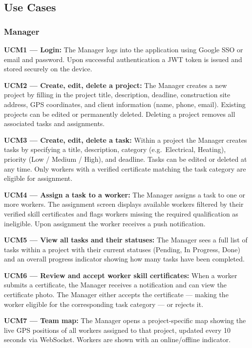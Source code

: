 \documentclass[12pt,a4paper]{article}
\begin{document}
\subsection{Use Cases}

\subsubsection{Manager}

\textbf{UCM1 --- Login:} The Manager logs into the application using Google SSO or email and password. Upon successful authentication a JWT token is issued and stored securely on the device.

\textbf{UCM2 --- Create, edit, delete a project:} The Manager creates a new project by filling in the project title, description, deadline, construction site address, GPS coordinates, and client information (name, phone, email). Existing projects can be edited or permanently deleted. Deleting a project removes all associated tasks and assignments.

\textbf{UCM3 --- Create, edit, delete a task:} Within a project the Manager creates tasks by specifying a title, description, category (e.g.\ Electrical, Heating), priority (Low / Medium / High), and deadline. Tasks can be edited or deleted at any time. Only workers with a verified certificate matching the task category are eligible for assignment.

\textbf{UCM4 --- Assign a task to a worker:} The Manager assigns a task to one or more workers. The assignment screen displays available workers filtered by their verified skill certificates and flags workers missing the required qualification as ineligible. Upon assignment the worker receives a push notification.

\textbf{UCM5 --- View all tasks and their statuses:} The Manager sees a full list of tasks within a project with their current statuses (Pending, In Progress, Done) and an overall progress indicator showing how many tasks have been completed.

\textbf{UCM6 --- Review and accept worker skill certificates:} When a worker submits a certificate, the Manager receives a notification and can view the certificate photo. The Manager either accepts the certificate --- making the worker eligible for the corresponding task category --- or rejects it.

\textbf{UCM7 --- Team map:} The Manager opens a project-specific map showing the live GPS positions of all workers assigned to that project, updated every 10 seconds via WebSocket. Workers are shown with an online/offline indicator.
\end{document}
